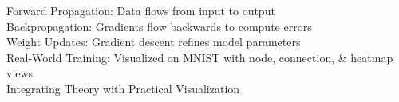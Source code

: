 \documentclass[preview]{standalone}
\begin{document}
Forward Propagation: Data flows from input to output\\Backpropagation: Gradients flow backwards to compute errors\\Weight Updates: Gradient descent refines model parameters\\Real-World Training: Visualized on MNIST with node, connection, & heatmap views\\Integrating Theory with Practical Visualization\\
\end{document}
